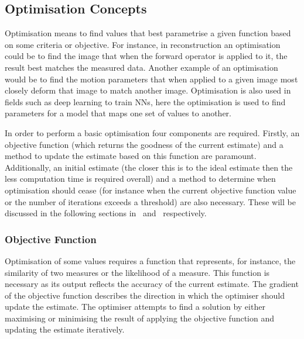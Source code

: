         \subsection{Optimisation Concepts} \label{sec:optimisation_concepts}
            Optimisation means to find values that best parametrise a given function based on some criteria or objective. %
            For instance, in reconstruction an optimisation could be to find the image that when the forward operator is applied to it, the result best matches the measured data. Another example of an optimisation would be to find the motion parameters that when applied to a given image most closely deform that image to match another image. Optimisation is also used in fields such as deep learning to train \glspl{NN}, here the optimisation is used to find parameters for a model that maps one set of values to another.%
            
            
            In order to perform a basic optimisation four components are required. Firstly, an objective function (which returns the goodness of the current estimate) and a method to update the estimate based on this function are paramount. Additionally, an initial estimate (the closer this is to the ideal estimate then the less computation time is required overall) and a method to determine when optimisation should cease (for instance when the current objective function value or the number of iterations exceeds a threshold) are also necessary. These will be discussed in the following sections in~ and~ respectively.
        
            \subsubsection{Objective Function} \label{sec:objective_function}
                Optimisation of some values requires a function that represents, for instance, the similarity of two measures or the likelihood of a measure. This function is necessary as its output reflects the accuracy of the current estimate. The gradient of the objective function describes the direction in which the optimiser should update the estimate. The optimiser attempts to find a solution by either maximising or minimising the result of applying the objective function and updating the estimate iteratively.
                
